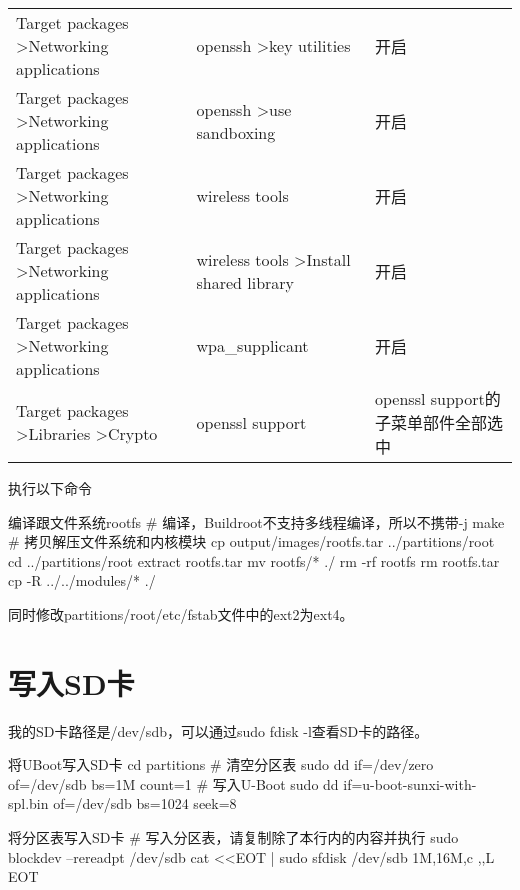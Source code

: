 \documentclass[lang=cn,newtx,10pt,scheme=chinese]{elegantbook}
\begin{document}
\begin{table}[ht]
\begin{adjustbox}{width=1\textwidth}
\begin{tabular}{|l|l|l|}
Target packages \textgreater Networking applications       & openssh \textgreater key utilities                 & 开启                        \\
Target packages \textgreater Networking applications       & openssh \textgreater use sandboxing                & 开启                        \\
Target packages \textgreater Networking applications       & wireless tools                                     & 开启                        \\
Target packages \textgreater Networking applications       & wireless tools \textgreater Install shared library & 开启                        \\
Target packages \textgreater Networking applications       & wpa\_supplicant                                    & 开启                        \\
Target packages \textgreater Libraries \textgreater Crypto & openssl support                                    & openssl support的子菜单部件全部选中 \\
\hline
\end{tabular}
\end{adjustbox}
\end{table}

执行以下命令

\begin{mycode}{编译跟文件系统rootfs}
# 编译，Buildroot不支持多线程编译，所以不携带-j
make
# 拷贝解压文件系统和内核模块
cp output/images/rootfs.tar ../partitions/root
cd ../partitions/root
extract rootfs.tar
mv rootfs/* ./
rm -rf rootfs
rm rootfs.tar
cp -R ../../modules/* ./
\end{mycode}

同时修改partitions/root/etc/fstab文件中的ext2为ext4。

\section{写入SD卡}

我的SD卡路径是/dev/sdb，可以通过sudo fdisk -l查看SD卡的路径。

\begin{mycode}{将UBoot写入SD卡}
cd partitions
# 清空分区表
sudo dd if=/dev/zero of=/dev/sdb bs=1M count=1
# 写入U-Boot
sudo dd if=u-boot-sunxi-with-spl.bin of=/dev/sdb bs=1024 seek=8
\end{mycode}

\begin{mycode}{将分区表写入SD卡}
# 写入分区表，请复制除了本行内的内容并执行
sudo blockdev --rereadpt /dev/sdb
cat <<EOT | sudo sfdisk /dev/sdb
1M,16M,c
,,L
EOT
\end{mycode}
\end{document}
